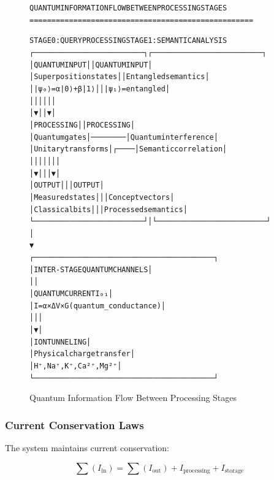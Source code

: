 \documentclass[11pt,a4paper]{article}
\newenvironment{asciiart}{\begin{alltt}}{\end{alltt}}
\begin{document}
\begin{figure}[H]
\centering
\begin{asciiart}
QUANTUM INFORMATION FLOW BETWEEN PROCESSING STAGES
===================================================

STAGE 0: QUERY PROCESSING           STAGE 1: SEMANTIC ANALYSIS
┌─────────────────────────┐        ┌─────────────────────────┐
│ QUANTUM INPUT           │        │ QUANTUM INPUT           │
│ Superposition states    │        │ Entangled semantics    │
│ |ψ₀⟩ = α|0⟩ + β|1⟩     │        │ |ψ₁⟩ = entangled      │
│          │              │        │          │              │
│          ▼              │        │          ▼              │
│ PROCESSING              │        │ PROCESSING              │
│ Quantum gates           │────────│ Quantum interference   │
│ Unitary transforms      │   ┌────│ Semantic correlation   │
│          │              │   │    │          │              │
│          ▼              │   │    │          ▼              │
│ OUTPUT                  │   │    │ OUTPUT                  │
│ Measured states         │   │    │ Concept vectors         │
│ Classical bits          │   │    │ Processed semantics     │
└─────────────────────────┘   │    └─────────────────────────┘
                              │
                              ▼
            ┌─────────────────────────────────────────┐
            │       INTER-STAGE QUANTUM CHANNELS      │
            │                                         │
            │  QUANTUM CURRENT I₀₁                   │
            │  I = α × ΔV × G(quantum_conductance)    │
            │               │                         │
            │               ▼                         │
            │  ION TUNNELING                         │
            │  Physical charge transfer               │
            │  H⁺, Na⁺, K⁺, Ca²⁺, Mg²⁺              │
            └─────────────────────────────────────────┘
\end{asciiart}
\caption{Quantum Information Flow Between Processing Stages}
\end{figure}

\subsubsection{Current Conservation Laws}

The system maintains current conservation:

\begin{equation}
\sum(I_{\text{in}}) = \sum(I_{\text{out}}) + I_{\text{processing}} + I_{\text{storage}}
\end{equation}
\end{document}
